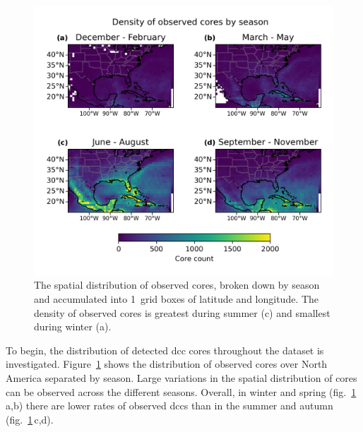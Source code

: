 \begin{figure}[!tp]
    \centering
    \includegraphics[width=\textwidth]{figures/chapter2_03.png}
    \caption[
    The spatial distribution of observed cores by season
    ]{
    The spatial distribution of observed cores, broken down by season and accumulated into 1\textdegree\ grid boxes of latitude and longitude. The density of observed cores is greatest during summer (c) and smallest during winter (a).
    }
    \label{fig:core_density_by_season}
\end{figure}

To begin, the distribution of detected \acrshort{dcc} cores throughout the dataset is investigated.
Figure~\ref{fig:core_density_by_season} shows the distribution of observed cores over North America separated by season.
Large variations in the spatial distribution of cores can be observed across the different seasons.
Overall, in winter and spring (fig.~\ref{fig:core_density_by_season}\,a,b) there are lower rates of observed \acrshort{dcc}s than in the summer and autumn (fig.~\ref{fig:core_density_by_season}\,c,d).

